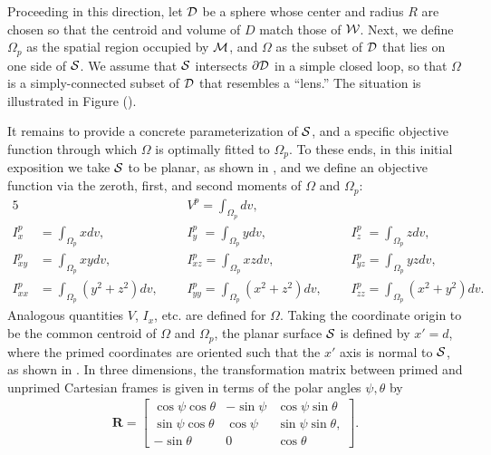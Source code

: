 Proceeding in this direction, let $\mathcal{D}$ be a sphere whose center and radius $R$ are chosen so that the centroid and volume of $D$ match those of $\mathcal{W}$.  Next, we define $\Omega_p$ as the spatial region occupied by $\mathcal{M}$, and $\Omega$ as the subset of $\mathcal{D}$ that lies on one side of $\mathcal{S}$.  We assume that $\mathcal{S}$ intersects $\partial \mathcal{D}$ in a simple closed loop, so that $\Omega$ is a simply-connected subset of $\mathcal{D}$ that resembles a ``lens.''  The situation is illustrated in Figure ().  

It remains to provide a concrete parameterization of $\mathcal{S}$, and a specific objective function through which $\Omega$ is optimally fitted to $\Omega_p$.  To these ends, in this initial exposition we take $\mathcal{S}$ to be planar, as shown in , and we define an objective function via the zeroth, first, and second moments of $\Omega$ and $\Omega_p$: 
\begin{alignat}{5}
&{} &&V^p = \int_{\Omega_p}dv, &&{} \\
I_{x\phantom{z}}^p &= \int_{\Omega_p}xdv, &&I_{y\phantom{z}}^p = \int_{\Omega_p}ydv, &&I_{z\phantom{z}}^p = \int_{\Omega_p}zdv, \\
I^p_{xy} &= \int_{\Omega_p}xydv, &&I^p_{xz} = \int_{\Omega_p}xzdv, &&I^p_{yz} = \int_{\Omega_p}yzdv, \\
I^p_{xx} &= \int_{\Omega_p}(y^2 + z^2)dv, \text{\ \ \ \ \ \ }&&I^p_{yy} = \int_{\Omega_p}(x^2 + z^2)dv, \text{\ \ \ \ \ \ }&&I^p_{zz} = \int_{\Omega_p}(x^2 + y^2)dv.
\end{alignat}
Analogous quantities $V$, $I_x$, etc. are defined for $\Omega$.  Taking the coordinate origin to be the common centroid of $\Omega$ and $\Omega_p$, the planar surface $\mathcal{S}$ is defined by $x' = d$, where the primed coordinates are oriented such that the $x'$ axis is normal to $\mathcal{S}$, as shown in .  In three dimensions, the transformation matrix between primed and unprimed Cartesian frames is given in terms of the polar angles $\psi, \theta$ by
\begin{gather}
\bm{R} = \left[\begin{array} {ccc} {\cos\psi\cos\theta} & {-\sin\psi} & {\cos\psi\sin\theta}\\ {\sin\psi\cos\theta} & {\cos\psi} & {\sin\psi\sin\theta}, \\
{-\sin\theta} & {0} & {\cos\theta}\end{array} \right].
\end{gather}


